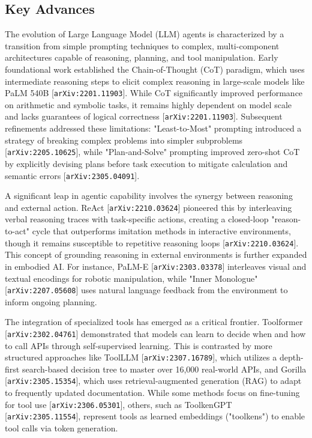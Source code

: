 \documentclass[11pt]{article}
\begin{document}
\subsection{Key Advances}

The evolution of Large Language Model (LLM) agents is characterized by a transition from simple prompting techniques to complex, multi-component architectures capable of reasoning, planning, and tool manipulation. Early foundational work established the Chain-of-Thought (CoT) paradigm, which uses intermediate reasoning steps to elicit complex reasoning in large-scale models like PaLM 540B [\texttt{arXiv:2201.11903}]. While CoT significantly improved performance on arithmetic and symbolic tasks, it remains highly dependent on model scale and lacks guarantees of logical correctness [\texttt{arXiv:2201.11903}]. Subsequent refinements addressed these limitations: "Least-to-Most" prompting introduced a strategy of breaking complex problems into simpler subproblems [\texttt{arXiv:2205.10625}], while "Plan-and-Solve" prompting improved zero-shot CoT by explicitly devising plans before task execution to mitigate calculation and semantic errors [\texttt{arXiv:2305.04091}].

A significant leap in agentic capability involves the synergy between reasoning and external action. ReAct [\texttt{arXiv:2210.03624}] pioneered this by interleaving verbal reasoning traces with task-specific actions, creating a closed-loop "reason-to-act" cycle that outperforms imitation methods in interactive environments, though it remains susceptible to repetitive reasoning loops [\texttt{arXiv:2210.03624}]. This concept of grounding reasoning in external environments is further expanded in embodied AI. For instance, PaLM-E [\texttt{arXiv:2303.03378}] interleaves visual and textual encodings for robotic manipulation, while "Inner Monologue" [\texttt{arXiv:2207.05608}] uses natural language feedback from the environment to inform ongoing planning.

The integration of specialized tools has emerged as a critical frontier. Toolformer [\texttt{arXiv:2302.04761}] demonstrated that models can learn to decide when and how to call APIs through self-supervised learning. This is contrasted by more structured approaches like ToolLLM [\texttt{arXiv:2307.16789}], which utilizes a depth-first search-based decision tree to master over 16,000 real-world APIs, and Gorilla [\texttt{arXiv:2305.15354}], which uses retrieval-augmented generation (RAG) to adapt to frequently updated documentation. While some methods focus on fine-tuning for tool use [\texttt{arXiv:2306.05301}], others, such as ToolkenGPT [\texttt{arXiv:2305.11554}], represent tools as learned embeddings ("toolkens") to enable tool calls via token generation.
\end{document}
